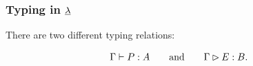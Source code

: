 \begin{frame}
  \frametitle{Typing in $\underline{\lambda}$}
	
  There are two different typing relations:
	
  \[ \Gamma\vdash P:A \qquad \text{and} \qquad \Gamma\rhd E:B. \]
	
   
\end{frame}

